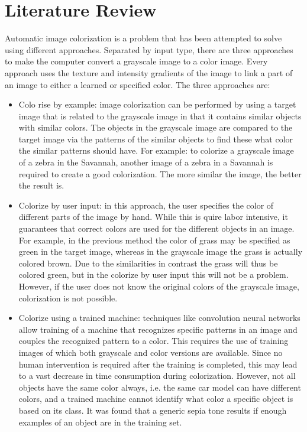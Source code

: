 \section{Literature Review} \label{sec:litreview}
Automatic image colorization is a problem that has been attempted to solve using different approaches. Separated by input type, there are three approaches to make the computer convert a grayscale image to a color image. Every approach uses the texture and intensity gradients of the image to link a part of an image to either a learned or specified color. The three approaches are:


\begin{itemize}
	\item Colo rise by example: image colorization can be performed by using a target image that is related to the grayscale image in that it contains similar objects with similar colors. The objects in the grayscale image are compared to the target image via the patterns of the similar objects to find these what color the similar patterns should have. For example: to colorize a grayscale image of a zebra in the Savannah, another image of a zebra in a Savannah is required to create a good colorization. The more similar the image, the better the result is.
	
	\item Colorize by user input: in this approach, the user specifies the color of different parts of the image by hand. While this is quire labor intensive, it guarantees that correct colors are used for the different objects in an image. For example, in the previous method the color of grass may be specified as green in the target image, whereas in the grayscale image the grass is actually colored brown. Due to the similarities in contrast the grass will thus be colored green, but in the colorize by user input this will not be a problem. However, if the user does not know the original colors of the grayscale image, colorization is not possible.
	
	\item Colorize using a trained machine: techniques like convolution neural networks allow training of a machine that recognizes specific patterns in an image and couples the recognized pattern to a color. This requires the use of training images of which both grayscale and color versions are available. Since no human intervention is required after the training is completed, this may lead to a vast decrease in time consumption during colorization. However, not all objects have the same color always, i.e. the same car model can have different colors, and a trained machine cannot identify what color a specific object is based on its class. It was found that a generic sepia tone results if enough examples of an object are in the training set.

\end{itemize}









